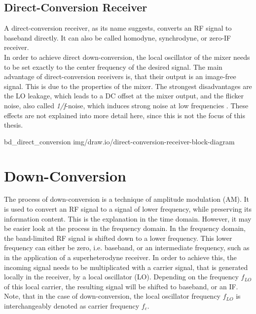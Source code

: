 \subsection{Direct-Conversion Receiver}

A direct-conversion receiver, as its name suggests, converts an RF signal to baseband directly.
It can also be called homodyne, synchrodyne, or zero-IF receiver.\\

In order to achieve direct down-conversion, the local oscillator of the mixer needs to be set exactly to the center frequency of the desired signal.
The main advantage of direct-conversion receivers is, that their output is an image-free signal.
This is due to the properties of the mixer.
The strongest disadvantages are the LO leakage, which leads to a DC offset at the mixer output, and the flicker noise, also called \textit{1/f}-noise, which induces strong noise at low frequencies \cite{PassosFábio2020AHSo}.
These effects are not explained into more detail here, since this is not the focus of this thesis.

 {bd_direct_conversion} {img/draw.io/direct-conversion-receiver-block-diagram}


\section{Down-Conversion}

The process of down-conversion is a technique of amplitude modulation (AM).
It is used to convert an RF signal to a signal of lower frequency, while preserving its information content.
This is the explanation in the time domain.
However, it may be easier look at the process in the frequency domain.
In the frequency domain, the band-limited RF signal is shifted down to a lower frequency.
This lower frequency can either be zero, i.e. baseband, or an intermediate frequency, such as in the application of a superheterodyne receiver.
In order to achieve this, the incoming signal needs to be multiplicated with a carrier signal, that is generated locally in the receiver, by a local oscillator (LO).
Depending on the frequency $f_{LO}$ of this local carrier, the resulting signal will be shifted to baseband, or an IF.
Note, that in the case of down-conversion, the local oscillator frequency $f_{LO}$ is interchangeably denoted as carrier frequency $f_c$.\\

